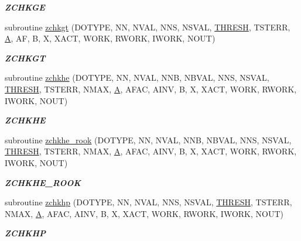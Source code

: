 \begin{DoxyCompactItemize}
\begin{DoxyCompactList}\small\item\em {\bfseries Z\+C\+H\+K\+G\+E} \end{DoxyCompactList}\item 
subroutine \hyperlink{group__complex16__lin_ga6d1bfce26a6505634f9cd04fdcc17c58}{zchkgt} (D\+O\+T\+Y\+P\+E, N\+N, N\+V\+A\+L, N\+N\+S, N\+S\+V\+A\+L, \hyperlink{zlaqgs_8c_a0656018abfc9fa2821827415f5d5ea57}{T\+H\+R\+E\+S\+H}, T\+S\+T\+E\+R\+R, \hyperlink{classA}{A}, A\+F, B, X, X\+A\+C\+T, W\+O\+R\+K, R\+W\+O\+R\+K, I\+W\+O\+R\+K, N\+O\+U\+T)
\begin{DoxyCompactList}\small\item\em {\bfseries Z\+C\+H\+K\+G\+T} \end{DoxyCompactList}\item 
subroutine \hyperlink{group__complex16__lin_gaf7cdf93c186e5f9622e751c672a1d3a3}{zchkhe} (D\+O\+T\+Y\+P\+E, N\+N, N\+V\+A\+L, N\+N\+B, N\+B\+V\+A\+L, N\+N\+S, N\+S\+V\+A\+L, \hyperlink{zlaqgs_8c_a0656018abfc9fa2821827415f5d5ea57}{T\+H\+R\+E\+S\+H}, T\+S\+T\+E\+R\+R, N\+M\+A\+X, \hyperlink{classA}{A}, A\+F\+A\+C, A\+I\+N\+V, B, X, X\+A\+C\+T, W\+O\+R\+K, R\+W\+O\+R\+K, I\+W\+O\+R\+K, N\+O\+U\+T)
\begin{DoxyCompactList}\small\item\em {\bfseries Z\+C\+H\+K\+H\+E} \end{DoxyCompactList}\item 
subroutine \hyperlink{group__complex16__lin_ga5a9d54bc90d30616f2367ed79fb67272}{zchkhe\+\_\+rook} (D\+O\+T\+Y\+P\+E, N\+N, N\+V\+A\+L, N\+N\+B, N\+B\+V\+A\+L, N\+N\+S, N\+S\+V\+A\+L, \hyperlink{zlaqgs_8c_a0656018abfc9fa2821827415f5d5ea57}{T\+H\+R\+E\+S\+H}, T\+S\+T\+E\+R\+R, N\+M\+A\+X, \hyperlink{classA}{A}, A\+F\+A\+C, A\+I\+N\+V, B, X, X\+A\+C\+T, W\+O\+R\+K, R\+W\+O\+R\+K, I\+W\+O\+R\+K, N\+O\+U\+T)
\begin{DoxyCompactList}\small\item\em {\bfseries Z\+C\+H\+K\+H\+E\+\_\+\+R\+O\+O\+K} \end{DoxyCompactList}\item 
subroutine \hyperlink{group__complex16__lin_ga99df5a68b5da4dd9be414b68a55c70df}{zchkhp} (D\+O\+T\+Y\+P\+E, N\+N, N\+V\+A\+L, N\+N\+S, N\+S\+V\+A\+L, \hyperlink{zlaqgs_8c_a0656018abfc9fa2821827415f5d5ea57}{T\+H\+R\+E\+S\+H}, T\+S\+T\+E\+R\+R, N\+M\+A\+X, \hyperlink{classA}{A}, A\+F\+A\+C, A\+I\+N\+V, B, X, X\+A\+C\+T, W\+O\+R\+K, R\+W\+O\+R\+K, I\+W\+O\+R\+K, N\+O\+U\+T)
\begin{DoxyCompactList}\small\item\em {\bfseries Z\+C\+H\+K\+H\+P} \end{DoxyCompactList}\item 

\end{DoxyCompactItemize}
